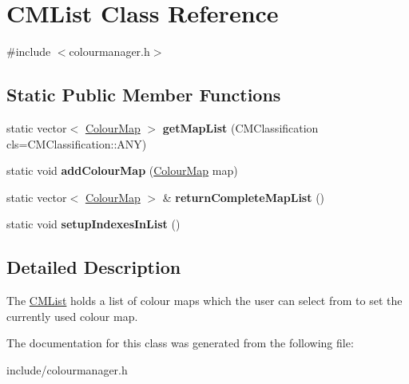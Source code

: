 \hypertarget{classCMList}{}\section{C\+M\+List Class Reference}
\label{classCMList}


{\ttfamily \#include $<$colourmanager.\+h$>$}

\subsection*{Static Public Member Functions}
\begin{DoxyCompactItemize}
\item 
\mbox{\label{classCMList_a80fd29892cd85578bb90ac0314d90fac}} 
static vector$<$ \hyperlink{classColourMap}{Colour\+Map} $>$ {\bfseries get\+Map\+List} (C\+M\+Classification cls=C\+M\+Classification\+::\+A\+NY)
\item 
\mbox{\label{classCMList_a3625314068ac7105031ee21020987041}} 
static void {\bfseries add\+Colour\+Map} (\hyperlink{classColourMap}{Colour\+Map} map)
\item 
\mbox{\label{classCMList_a1b07fca77729021f4f8b0e9e20c964f6}} 
static vector$<$ \hyperlink{classColourMap}{Colour\+Map} $>$ \& {\bfseries return\+Complete\+Map\+List} ()
\item 
\mbox{\label{classCMList_adfa7121839cd103ac76d2895a5a77065}} 
static void {\bfseries setup\+Indexes\+In\+List} ()
\end{DoxyCompactItemize}


\subsection{Detailed Description}
The \hyperlink{classCMList}{C\+M\+List} holds a list of colour maps which the user can select from to set the currently used colour map. 

The documentation for this class was generated from the following file\+:\begin{DoxyCompactItemize}
\item 
include/colourmanager.\+h\end{DoxyCompactItemize}
